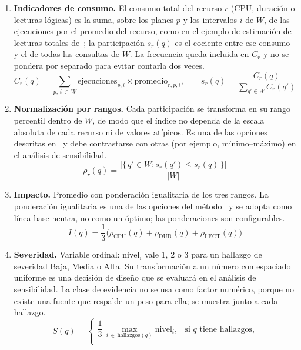\documentclass[11pt,a4paper]{report}
\begin{document}
\begin{enumerate}[label=\arabic*)]
\item \textbf{Indicadores de consumo.} El consumo total del recurso $r$ (CPU, duraci\'on o lecturas l\'ogicas) es la suma, sobre los planes $p$ y los intervalos $i$ de $W$, de las ejecuciones por el promedio del recurso, como en el ejemplo de estimaci\'on de lecturas totales de~\cite{R30}; la participaci\'on $s_r(q)$ es el cociente entre ese consumo y el de todas las consultas de $W$. La frecuencia queda incluida en $C_r$ y no se pondera por separado para evitar contarla dos veces.
\begin{equation}\label{eq:consumo}
C_r(q)=\sum_{p,\,i\,\in\, W}\mathrm{ejecuciones}_{p,i}\times\mathrm{promedio}_{r,p,i},\qquad
s_r(q)=\frac{C_r(q)}{\sum_{q'\in W}C_r(q')}
\end{equation}
\item \textbf{Normalizaci\'on por rangos.} Cada participaci\'on se transforma en su rango percentil dentro de $W$, de modo que el \'indice no dependa de la escala absoluta de cada recurso ni de valores at\'ipicos. Es una de las opciones descritas en~\cite{R32} y debe contrastarse con otras (por ejemplo, m\'inimo--m\'aximo) en el an\'alisis de sensibilidad.
\begin{equation}\label{eq:rango}
\rho_r(q)=\frac{\bigl|\{\,q'\in W : s_r(q')\le s_r(q)\,\}\bigr|}{|W|}
\end{equation}
\item \textbf{Impacto.} Promedio con ponderaci\'on igualitaria de los tres rangos. La ponderaci\'on igualitaria es una de las opciones del m\'etodo~\cite{R32} y se adopta como l\'inea base neutra, no como un \'optimo; las ponderaciones son configurables.
\begin{equation}\label{eq:impacto}
I(q)=\frac{1}{3}\bigl(\rho_{\mathrm{CPU}}(q)+\rho_{\mathrm{DUR}}(q)+\rho_{\mathrm{LECT}}(q)\bigr)
\end{equation}
\item \textbf{Severidad.} Variable ordinal: $\mathrm{nivel}_i$ vale 1, 2 o 3 para un hallazgo de severidad Baja, Media o Alta. Su transformaci\'on a un n\'umero con espaciado uniforme es una decisi\'on de dise\~no que se evaluar\'a en el an\'alisis de sensibilidad. La clase de evidencia no se usa como factor num\'erico, porque no existe una fuente que respalde un peso para ella; se muestra junto a cada hallazgo.
\begin{equation}\label{eq:severidad}
S(q)=\begin{cases}
\dfrac{1}{3}\,\max\limits_{i\,\in\,\mathrm{hallazgos}(q)}\mathrm{nivel}_i, & \text{si } q \text{ tiene hallazgos,}\\[4pt]

\end{cases}
\end{equation}
\end{enumerate}
\end{document}
